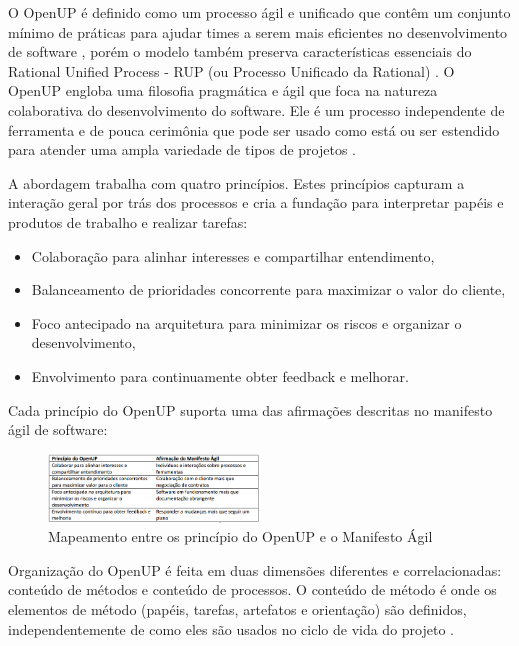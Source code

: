 \documentclass{acm_proc_article-sp}
\begin{document}
O OpenUP é definido como um processo ágil e unificado que contêm um conjunto mínimo de práticas para ajudar times a serem mais eficientes no desenvolvimento de software \cite{openUP:agil}, porém o modelo também preserva características essenciais do Rational Unified Process - RUP (ou Processo Unificado da Rational) \cite{openUP:hibrido}. O OpenUP engloba uma filosofia pragmática e ágil que foca na natureza colaborativa do desenvolvimento do software. Ele é um processo independente de ferramenta e de pouca cerimônia que pode ser usado como está ou ser estendido para atender uma ampla variedade de tipos de projetos \cite{openUP:agil}.

A abordagem trabalha com quatro princípios. Estes princípios capturam a interação geral por trás dos processos e cria a fundação para interpretar papéis e produtos de trabalho e realizar tarefas:

\begin{itemize}
\item Colaboração para alinhar interesses e compartilhar entendimento,
\item Balanceamento de prioridades concorrente para maximizar o valor do cliente,
\item Foco antecipado na arquitetura para minimizar os riscos e organizar o desenvolvimento,
\item Envolvimento para continuamente obter feedback e melhorar.
\end{itemize}

Cada princípio do OpenUP suporta uma das afirmações descritas no manifesto ágil de software:

\begin{figure}[h]
\centering %
\includegraphics[width=0.5\textwidth]{tabela_prinOpen_manifesto.png} %
\caption{Mapeamento entre os princípio do OpenUP e o Manifesto Ágil \cite{openUP:agil}}
\end{figure}

Organização do OpenUP é feita em  duas dimensões diferentes e correlacionadas: conteúdo de métodos e conteúdo de processos. O conteúdo de método é onde os elementos de método (papéis, tarefas, artefatos e orientação) são definidos, independentemente de como eles são usados no ciclo de vida do projeto \cite{openUP:agil}.
\end{document}
